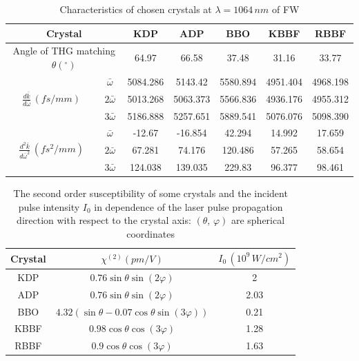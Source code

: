 \documentclass[a4paper, 12pt, onecolumn]{extarticle}
\begin{document}
\begin{table}
\caption{Characteristics of chosen crystals at \(\lambda=1064\,nm\) of FW}
{\begin{tabular}{|c|c|c|c|c|c|c|} 
\hline
\multicolumn{2}{|c|}{Crystal}& KDP \cite{bib:n26} & ADP \cite{bib:n26} & BBO \cite{bib:c1} & KBBF \cite{bib:c2} &RBBF \cite{bib:c3}\\
\hline
\multicolumn{2}{|c|}{Angle of THG matching $\theta (^{\circ})$} & 64.97 & 66.58 & 37.48 & 31.16 & 33.77 \\
\hline
\multirow{3}{*}{$\frac{d\bar{k}}{d\bar{\omega}}\,(fs/mm)$}& $\bar{\omega}$ & 5084.286 & 5143.42 & 5580.894 & 4951.404 & 4968.198 \\
\cline{2-7}
&$2\bar{\omega}$& 5013.268 & 5063.373 & 5566.836 & 4936.176 & 4955.312 \\
\cline{2-7}
&$3\bar{\omega}$& 5186.888 & 5257.651 & 5889.541 & 5076.076 & 5098.390\\
\hline
\multirow{3}{*}{$\frac{d^2\bar{k}}{d\bar{\omega}^2}\,(fs^2/mm)$}&$\bar{\omega}$ & -12.67 & -16.854 & 42.294 & 14.992 & 17.659 \\
\cline{2-7}
&$2\bar{\omega}$& 67.281 & 74.176 & 120.486 & 57.265 & 58.654 \\
\cline{2-7}
&$3\bar{\omega}$& 124.038 & 139.035 & 229.83 & 96.377 & 98.461 \\
\hline
\end{tabular}
\label{tab:1}}
\end{table}



\begin{table}
\caption{The second order susceptibility of some crystals and the incident pulse intensity $I_0$ in dependence of the laser pulse propagation direction with respect to the crystal axis: \((\theta,\,\varphi)\) are spherical coordinates }
{\begin{tabular}{|c|c|c|} 
\hline
Crystal& $\chi^{(2)} (pm/V)$ & $ I_0\,(10^9\,W/cm^2)$ \\
\hline
KDP \cite{bib:c4}& $0.76\sin\theta\sin(2\varphi)$ & 2 \\
\hline
ADP \cite{bib:c4}& $0.76\sin\theta\sin(2\varphi)$ & 2.03 \\
\hline
BBO \cite{bib:c4}& $4.32(\sin\theta-0.07\cos\theta\sin(3\varphi))$ & 0.21 \\
\hline
KBBF \cite{bib:c5}& $0.98\cos\theta\cos(3\varphi)$ & 1.28 \\
\hline
RBBF \cite{bib:c3}& $0.9\cos\theta\cos(3\varphi)$ & 1.63 \\
\hline
\end{tabular}
\label{tab:2}}
\end{table}
\end{document}
